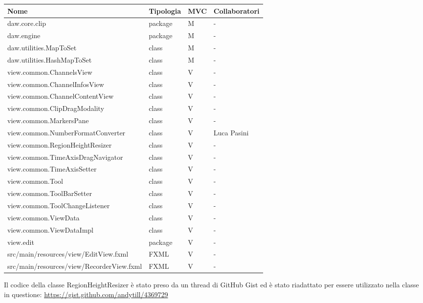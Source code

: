 \documentclass[a4paper,12pt]{report}
\begin{document}
\begin{center}
\begin{longtable}{| m{23em} | m{1.5cm}| m{1cm} | m{2.5cm} |} 
 \hline
 Nome & Tipologia & MVC & Collaboratori \\ [0.5ex]
 \hline
 daw.core.clip & package & M & - \\ 
 \hline
 daw.engine & package & M & - \\
 \hline
 daw.utilities.MapToSet & class & M & - \\
 \hline
 daw.utilities.HashMapToSet & class & M & - \\
 \hline
 view.common.ChannelsView & class & V & - \\
\hline
 view.common.ChannelInfosView & class & V & - \\
\hline
view.common.ChannelContentView & class & V & - \\
\hline
view.common.ClipDragModality & class & V & - \\
\hline
view.common.MarkersPane & class & V & - \\
\hline
view.common.NumberFormatConverter & class & V & Luca Pasini \\
\hline
view.common.RegionHeightResizer & class & V & - \\
\hline
view.common.TimeAxisDragNavigator & class & V & - \\
\hline
view.common.TimeAxisSetter & class & V & - \\
\hline
view.common.Tool & class & V & - \\
\hline
view.common.ToolBarSetter & class & V & - \\
\hline
view.common.ToolChangeListener & class & V & - \\
\hline
view.common.ViewData & class & V & - \\
\hline
view.common.ViewDataImpl & class & V & - \\
\hline
view.edit & package & V & - \\
\hline
src/main/resources/view/EditView.fxml & FXML & V & - \\
\hline
src/main/resources/view/RecorderView.fxml & FXML & V & - \\
\hline
\end{longtable}
\end{center}
Il codice della classe RegionHeightResizer è stato preso da un thread di GitHub Gist ed è stato riadattato per essere utilizzato nella classe in questione:
\hyperlink{https://gist.github.com/andytill/4369729}{https://gist.github.com/andytill/4369729}
\endsubsubsection
\end{document}
